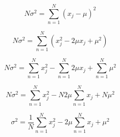 \documentclass[a4paper,10pt]{article}
\begin{document}
\begin{equation*}
N\sigma^2 = \sum_{n = 1}^{N} (x_j - \mu)^2
\end{equation*}

\begin{equation*}
N\sigma^2 = \sum_{n = 1}^{N} (x_j^2 -2\mu x_j + \mu^2)
\end{equation*}

\begin{equation*}
N\sigma^2 = \sum_{n = 1}^{N} x_j^2 -\sum_{n = 1}^{N} 2\mu x_j + \sum_{n = 1}^{N} \mu^2
\end{equation*}

\begin{equation*}
N\sigma^2 = \sum_{n = 1}^{N} x_j^2 -N2\mu\sum_{n = 1}^{N} x_j + N\mu^2
\end{equation*}

\begin{equation*}
\sigma^2 = \frac{1}{N}\sum_{n = 1}^{N} x_j^2 -2\mu\sum_{n = 1}^{N} x_j + \mu^2
\end{equation*}

% 
% 
% 


\end{document}
